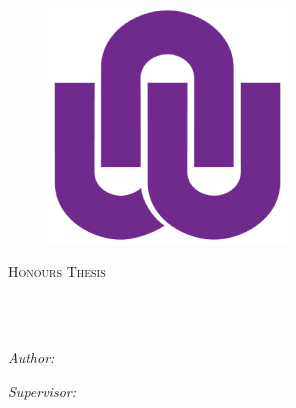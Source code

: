 \documentclass[
12pt, %
english, %
doublespacing, %
headsepline, %
]{MastersDoctoralThesis} %
\author{Affaan \textsc{Muhammad}} %
\begin{document}
\frontmatter %

\pagestyle{plain} %


\begin{titlepage}
\begin{center}
\begin{figure}
\centering
\includegraphics[scale=0.3,trim=0 0 0 3cm]{Figures/logo}
\end{figure}
{\scshape\LARGE \univname\par}\vspace{1.5cm} %
\textsc{\Large Honours Thesis}\\[0.5cm] %

\HRule \\[0.4cm] %
{\huge \bfseries \ttitle\par}\vspace{0.4cm} %
\HRule \\[1.5cm] %
 
\begin{minipage}[t]{0.4\textwidth}
\begin{flushleft} \large
\emph{Author:}\\
\href{mailto:affaanm94@gmail.com}{\authorname} %
\end{flushleft}
\end{minipage}
\begin{minipage}[t]{0.4\textwidth}
\begin{flushright} \large
\emph{Supervisor:} \\
\href{mailto:Hennie.Kruger@nwu.ac.za}{\supname} %
\end{flushright}
\end{minipage}\\[3cm]
 

\end{center}
\end{titlepage}
\end{document}
